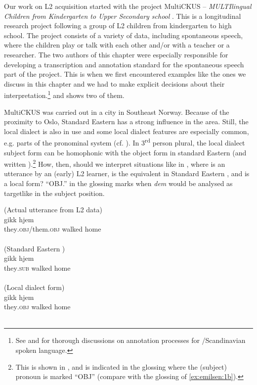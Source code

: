 \documentclass[output=paper,colorlinks,citecolor=brown,modfonts,nonflat]{../langscibook}
\begin{document}
Our work on L2 acquisition started with the project MultiCKUS – \textit{MULTIlingual Children from Kindergarten to Upper Secondary school} \citep{Arntzen2012}. This is a longitudinal research project following a group of  L2 children from kindergarten to high school. The project consists of a variety of data, including spontaneous speech, where the children play or talk with each other and/or with a teacher or a researcher. The two authors of this chapter were especially responsible for developing a transcription and annotation standard for the spontaneous speech part of the project. This is when we first encountered examples like the ones we discuss in this chapter and we had to make explicit decisions about their interpretation.\footnote{{See \citet{Johannessen2017} and \citet{Søfteland2018} for thorough discussions on annotation processes for /Scandinavian spoken language.}}  and  shows two of them.

MultiCKUS was carried out in a city in Southeast Norway. Because of the proximity to Oslo, Standard Eastern  has a strong influence in the area. Still, the local dialect is also in use and some local dialect features are especially common, e.g. parts of the pronominal system (cf. \citealt{StjernholmSøfteland2019}). In 3\textsuperscript{rd} person plural, the local dialect subject form can be homophonic with the object form in standard Eastern  (and written ).\footnote{{This is shown in , and is indicated in the glossing where the (subject) pronoun is marked “OBJ” (compare with the glossing of \ref{ex:emilsen:1b}).}} How, then, should we interpret situations like in , where  is an utterance by an (early) L2 learner,  is the equivalent in Standard Eastern , and  is a local form? “OBJ.” in the glossing marks when \textit{dem} would be analysed as targetlike in the subject position.

\ea\label{ex:emilsen:1}
\ea\label{ex:emilsen:1a}
(Actual utterance from L2 data)\\
  {gikk}  {hjem}\\
 they\textsc{.obj}/them\textsc{.obj} walked home \\
  \\

 \newpage
\ex\label{ex:emilsen:1b}
(Standard Eastern )\\
  {gikk}  {hjem}\\
 they\textsc{.sub} walked home \\
 \\
\ex\label{ex:emilsen:1c}
(Local dialect form)\\
  {gikk}  {hjem}\\
 they\textsc{.obj} walked home \\
  \\
\z
\z
\end{document}
